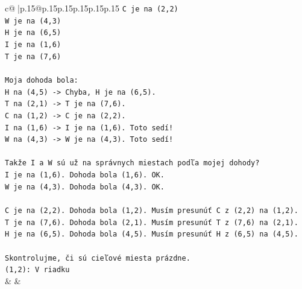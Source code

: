 \documentclass{article}
\begin{document}
{\begin{supertabular}{c@{$\;$}|p{.15\linewidth}@{}p{.15\linewidth}p{.15\linewidth}p{.15\linewidth}p{.15\linewidth}p{.15\linewidth}}
{{{\texttt{C je na (2,2)} \\
\texttt{W je na (4,3)} \\
\texttt{H je na (6,5)} \\
\texttt{I je na (1,6)} \\
\texttt{T je na (7,6)} \\
\\ 
\texttt{Moja dohoda bola:} \\
\texttt{H na (4,5) {-}> Chyba, H je na (6,5).} \\
\texttt{T na (2,1) {-}> T je na (7,6).} \\
\texttt{C na (1,2) {-}> C je na (2,2).} \\
\texttt{I na (1,6) {-}> I je na (1,6). Toto sedí!} \\
\texttt{W na (4,3) {-}> W je na (4,3). Toto sedí!} \\
\\ 
\texttt{Takže I a W sú už na správnych miestach podľa mojej dohody?} \\
\texttt{I je na (1,6). Dohoda bola (1,6). OK.} \\
\texttt{W je na (4,3). Dohoda bola (4,3). OK.} \\
\\ 
\texttt{C je na (2,2). Dohoda bola (1,2). Musím presunúť C z (2,2) na (1,2).} \\
\texttt{T je na (7,6). Dohoda bola (2,1). Musím presunúť T z (7,6) na (2,1).} \\
\texttt{H je na (6,5). Dohoda bola (4,5). Musím presunúť H z (6,5) na (4,5).} \\
\\ 
\texttt{Skontrolujme, či sú cieľové miesta prázdne.} \\
\texttt{(1,2): V riadku} \\
            }
        }
    }
    & & \\ \\


\end{supertabular}}
\end{document}
